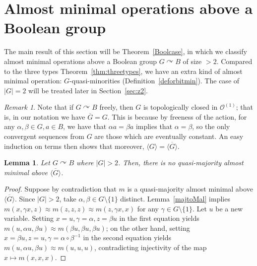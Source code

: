 \documentclass{article}
\newtheorem{lemma}[theorem]{Lemma}
\theoremstyle{remark}
\newtheorem{remark}[theorem]{Remark}
\theoremstyle{definition}
\def\acts{\curvearrowright}
\begin{document}
\section{Almost minimal operations above a Boolean group}\label{sec:boolalmost}
The main result of this section will be Theorem~\ref{Boolcase}, in which we classify almost minimal operations above a Boolean group $G\acts B$ of size $>2$. Compared to the three types Theorem~\ref{thm:threetypes}, we have an extra kind of almost minimal operation: $G$-quasi-minorities (Definition~\ref{deforbitmin}). The case of $|G|=2$ will be treated later in Section~\ref{sec:z2}.



\begin{remark}\label{rem:free} Note that if $G\acts B$ freely, then $G$ is topologically closed in $\mathcal{O}^{(1)}$; that is, in our notation we have  $\overline{G}=G$. This is  because by freeness of the action, for any $\alpha, \beta\in G, a\in B$, we have that  $\alpha a=\beta a$ implies that $\alpha=\beta$, so the only convergent sequences from $G$ are those which are eventually constant. An easy induction on terms then shows that moreover,  $\langle G\rangle=\overline{\langle G\rangle}$.
\end{remark}



\begin{lemma} \label{Bnomaj} Let $G\acts B$ where $|G|>2$. Then, there is no quasi-majority almost minimal above $\overline{\langle G\rangle}$. 
\end{lemma}
\begin{proof}
Suppose by contradiction that $m$ is a quasi-majority almost minimal above $\overline{\langle G\rangle}$. Since $|G|>2$, take $\alpha, \beta\in G\setminus \{1\}$ distinct. Lemma~\ref{majtoMal} implies $m(x,\gamma x,z)\approx m(z,z,z)\approx m(z,\gamma x,x)$ for any $\gamma \in G\setminus\{1\}$. Let $u$ be a new variable. Setting $x=u, \gamma=\alpha, z=\beta u$ in the first equation yields $m(u,\alpha u,\beta u)\approx m(\beta u,\beta u,\beta u)$; on the other hand, setting $x=\beta u, z=u, \gamma=\alpha\circ \beta^{-1}$ in the second equation yields $m(u,\alpha u,\beta u)\approx m(u,u,u)$, contradicting injectivity of the map  $x\mapsto m(x,x,x)$.
\end{proof}
\end{document}
